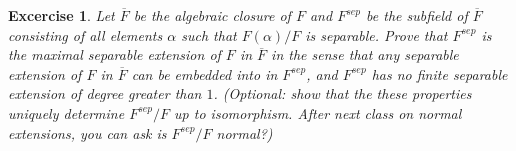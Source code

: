 \documentclass{article}
\newtheorem{exer}{Excercise}
\begin{document}
    \begin{exer}
    Let $\overline{F}$ be the algebraic closure of $F$ and $F^{sep}$ be the subfield of $\overline{F}$ consisting of all elements $\alpha$ such that $F(\alpha)/F$ is separable. Prove that $F^{sep}$ is the maximal separable extension of $F$ in $\overline{F}$ in the sense that any separable extension of $F$ in $\overline{F}$ can be embedded into in $F^{sep}$, and $F^{sep}$ has no finite separable extension of degree greater than $1$. (Optional: show that the these properties uniquely determine $F^{sep}/F$ up to isomorphism. After next class on normal extensions, you can ask is $F^{sep}/F$ normal?)
    \end{exer}
\end{document}
